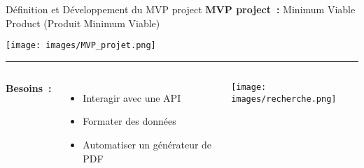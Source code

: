\begin{frame}{Définition et Développement du MVP project}
\textbf{MVP project~:} Minimum Viable Product (Produit Minimum Viable)
\begin{center}
    \texttt{[image: images/MVP\_projet.png]}
\end{center}

\vfill
\hrule 
\vspace*{0.4cm}

\begin{columns}[t]
    \vspace*{0.3cm}
        \textbf{Besoins~:}
\begin{itemize}
    \item Interagir avec une API
    \item Formater des données
    \item Automatiser un générateur de PDF
\end{itemize}
    \vspace*{-0.5cm}
        \begin{center}
            \texttt{[image: images/recherche.png]}
        \end{center}
    
\end{columns}
\end{frame}


